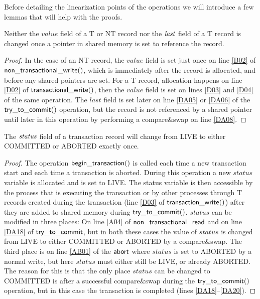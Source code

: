 Before detailing the linearization points of the operations we will introduce a few lemmas that will help
with the proofs.

\begin{lemma}
\label{lemma:si-nochange}
Neither the $\mathit{value}$ field of a T or NT record nor the $\ms{last}$ field of a T record is changed once a pointer in shared memory is set to 
reference the record.
\end{lemma}
\begin{proof}
In the case of an NT record, the $\mathit{value}$ field is set just once on line \ref{B02} of $\sf{non\_transactional\_write}()$,
which is immediately after the record is allocated, and before any shared pointers are set.
For a T record, allocation happens on line \ref{D02} of $\sf{transactional\_write}()$,
then the $\mathit{value}$ field is set on lines \ref{D03} and \ref{D04} of the same operation.
The $\mathit{last}$ field is set later on line \ref{DA05} or \ref{DA06} of the $\sf{try\_to\_commit}()$ operation,
but the record is not referenced by a shared pointer until later in this operation
by performing a compare\&swap on line \ref{DA08}.
\end{proof}


\begin{lemma}
\label{lemma:si-statusonce}
The $\ms{status}$ field of a transaction record will change from LIVE to either COMMITTED or ABORTED
exactly once.
\end{lemma}
\begin{proof}
The operation $\sf{begin\_transaction}()$ is called each time a new transaction start and each time a transaction is aborted.
During this operation a new $\mathit{status}$ variable is allocated and is set to LIVE.
The status variable is then accessible by the process that is executing the transaction or by other processes through T records created during the
transaction (line \ref{D03} of $\sf{transaction\_write}()$) after they are added to shared memory during $\sf{try\_to\_commit}()$.
$\mathit{status}$ can be modified in three places:
On line \ref{A04} of $\sf{non\_transactional\_read}$ and on line \ref{DA18} of $\sf{try\_to\_commit}$, but in both these cases
the value of $\mathit{status}$ is changed from LIVE to either COMMITTED or ABORTED by a compare\&swap.
The third place is on line \ref{AB01} of the $\sf{abort}$ where $\mathit{status}$ is set to ABORTED by a normal write, but
here $\mathit{status}$ must either still be LIVE, or already ABORTED.
The reason for this is that the only place $\mathit{status}$ can be changed to COMMITTED is after a successful compare\&swap
during the $\sf{try\_to\_commit}()$ operation, but in this case the transaction is completed (lines \ref{DA18}--\ref{DA20}).
\end{proof}

